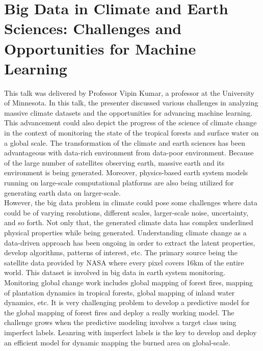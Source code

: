 \documentclass{report}
\begin{document}
\newpage


\section{Big Data in Climate and Earth Sciences: Challenges and Opportunities for Machine Learning}
This talk was delivered by Professor Vipin Kumar, a professor at the University of Minnesota. In this talk, the presenter discussed various challenges in analyzing massive climate datasets and the opportunities for advancing machine learning. This advancement could also depict the progress of the science of climate change in the context of monitoring the state of the tropical forests and surface water on a global scale. The transformation of the climate and earth sciences has been advantageous with data-rich environment from data-poor environment. Because of the large number of satellites observing earth, massive earth and its environment is being generated. Moreover, physics-based earth system models running on large-scale computational platforms are also being utilized for generating earth data on larger-scale.\\

However, the big data problem in climate could pose some challenges where data could be of varying resolutions, different scales, larger-scale noise, uncertainty, and so forth. Not only that, the generated climate data has complex underlined physical properties while being generated. Understanding climate change as a data-driven approach has been ongoing in order to extract the latent properties, develop algorithms, patterns of interest, etc. The primary source being the satellite data provided by NASA where every pixel covers 16km of the entire world. This dataset is involved in big data in earth system monitoring. Monitoring global change work includes global mapping of forest fires, mapping of plantation dynamics in tropical forests, global mapping of inland water dynamics, etc. It is very challenging problem to develop a predictive model for the global mapping of forest fires and deploy a really working model. The challenge grows when the predictive modeling involves a target class using imperfect labels. Leanring with imperfect labels is the key to develop and deploy an efficient model for dynamic mapping the burned area on global-scale.   

\newpage
\end{document}

